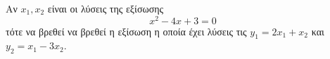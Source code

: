 Αν $ x_1,x_2 $ είναι οι λύσεις της εξίσωσης \[ x^2-4x+3=0 \] τότε να βρεθεί να βρεθεί η εξίσωση η οποία έχει λύσεις τις $ y_1=2x_1+x_2 $ και $ y_2=x_1-3x_2 $.
